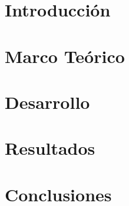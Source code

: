 \documentclass[letterpaper,12pt]{article}
\begin{document}
    

    \newpage

    \tableofcontents
    \setcounter{page}{1} %
    \newpage

    \section{Introducción}

    \lipsum[1-2]
    
    \section{Marco Teórico}

    \lipsum[1-2]

    \section{Desarrollo}

    \lipsum[1-2]

    \section{Resultados}

    \lipsum[1-2]

    \section{Conclusiones}

    \lipsum[1-2]
    
    \newpage
    \nocite{*} 
    \printbibliography
\end{document}
